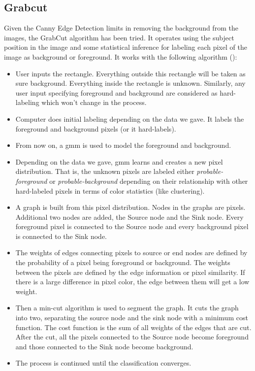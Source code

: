 \subsection{Grabcut}
\label{subsec:masking-grabcut}

Given the Canny Edge Detection limits in removing the background from the images, the GrabCut algorithm has been tried. It operates using the subject position in the image and some statistical inference for labeling each pixel of the image as background or foreground. It works with the following algorithm (\cite{opencv_grabcut}):

\begin{itemize}
	\item User inputs the rectangle. Everything outside this rectangle will be taken as sure background. Everything inside the rectangle is unknown. Similarly, any user input specifying foreground and background are considered as hard-labeling which won't change in the process.
	\item Computer does initial labeling depending on the data we gave. It labels the foreground and background pixels (or it hard-labels).
	\item From now on, a \gls{gmm} is used to model the foreground and background.
	\item Depending on the data we gave, \gls{gmm} learns and creates a new pixel distribution. That is, the unknown pixels are labeled either \textit{probable-foreground} or \textit{probable-background} depending on their relationship with other hard-labeled pixels in terms of color statistics (like clustering).
	\item A graph is built from this pixel distribution. Nodes in the graphs are pixels. Additional two nodes are added, the Source node and the Sink node. Every foreground pixel is connected to the Source node and every background pixel is connected to the Sink node.
	\item The weights of edges connecting pixels to source or end nodes are defined by the probability of a pixel being foreground or background. The weights between the pixels are defined by the edge information or pixel similarity. If there is a large difference in pixel color, the edge between them will get a low weight.
	\item Then a min-cut algorithm is used to segment the graph. It cuts the graph into two, separating the source node and the sink node with a minimum cost function. The cost function is the sum of all weights of the edges that are cut. After the cut, all the pixels connected to the Source node become foreground and those connected to the Sink node become background.
	\item The process is continued until the classification converges.
\end{itemize}


